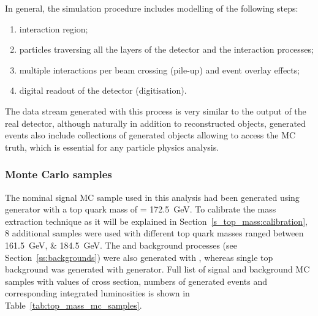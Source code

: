 In general, the simulation procedure includes modelling of the following steps:
\begin{enumerate}[label=\textbullet]
	\item interaction region;
	\item particles traversing all the layers of the detector and the interaction processes;
	\item multiple interactions per beam crossing (pile-up) and event overlay effects;
	\item digital readout of the detector (digitisation).
\end{enumerate}

The data stream generated with this process is very similar to the output of the real detector, although naturally in
addition to reconstructed objects, generated events also include collections of generated objects allowing to access the
MC truth, which is essential for any particle physics analysis.

\subsubsection{Monte Carlo samples}
The nominal signal \ttbar MC sample used in this analysis had been generated using \MADGRAPH generator with a top quark
mass of \mtop = \SI{172.5}{\GeV}. To calibrate the mass extraction technique as it will be explained in
Section~\ref{s_top_mass:calibration}, 8 additional \ttbar samples were used with different top quark masses ranged
between \SIlist{161.5;184.5}{\GeV}. The \WpJets and \ZpJets background processes (see Section~\ref{ss:backgrounds}) were
also generated with \MADGRAPH, whereas single top background was generated with \POWHEG generator. Full list of signal
\ttbar and background MC samples with values of cross section, numbers of generated events and corresponding integrated
luminosities is shown in Table~\ref{tab:top_mass_mc_samples}.



